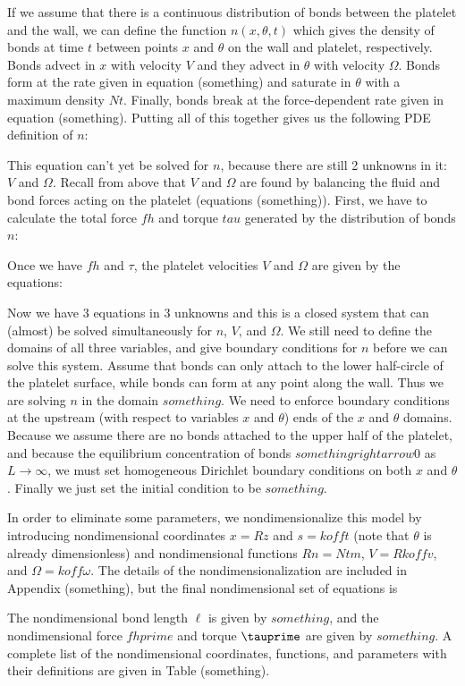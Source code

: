 If we assume that there is a continuous distribution of bonds between
the platelet and the wall, we can define the function $n(x, \theta,
t)$ which gives the density of bonds at time $t$ between points $x$
and $\theta$ on the wall and platelet, respectively. Bonds advect in
$x$ with velocity $V$ and they advect in $\theta$ with velocity
$\Omega$. Bonds form at the rate given in equation (something) and
saturate in $\theta$ with a maximum density $Nt$. Finally, bonds break
at the force-dependent rate given in equation (something). Putting all
of this together gives us the following PDE definition of $n$:

This equation can't yet be solved for $n$, because there are still 2
unknowns in it: $V$ and $\Omega$. Recall from above that $V$ and
$\Omega$ are found by balancing the fluid and bond forces acting on
the platelet (equations (something)). First, we have to calculate the
total force $fh$ and torque $tau$ generated by the distribution of
bonds $n$:

Once we have $fh$ and $\tau$, the platelet velocities $V$ and $\Omega$
are given by the equations: %

Now we have 3 equations in 3 unknowns and this is a closed system that
can (almost) be solved simultaneously for $n$, $V$, and $\Omega$. We
still need to define the domains of all three variables, and give
boundary conditions for $n$ before we can solve this system. Assume
that bonds can only attach to the lower half-circle of the platelet
surface, while bonds can form at any point along the wall. Thus we are
solving $n$ in the domain $something$. We need to enforce boundary
conditions at the upstream (with respect to variables $x$ and
$\theta$) ends of the $x$ and $\theta$ domains. Because we assume
there are no bonds attached to the upper half of the platelet, and
because the equilibrium concentration of bonds $something rightarrow
0$ as $L \rightarrow \infty$, we must set homogeneous Dirichlet
boundary conditions on both $x$ and $\theta$. Finally we just set the
initial condition to be $something$.

In order to eliminate some parameters, we nondimensionalize this model
by introducing nondimensional coordinates $x = Rz$ and $s = koff t$
(note that $\theta$ is already dimensionless) and nondimensional
functions $R n = Nt m$, $V = R koff v$, and $\Omega = koff
\omega$. The details of the nondimensionalization are included in
Appendix (something), but the final nondimensional set of equations is

The nondimensional bond length $\ell$ is given by $something$, and the
nondimensional force $fhprime$ and torque $\tauprime$ are given by
$something$. A complete list of the nondimensional coordinates,
functions, and parameters with their definitions are given in Table
(something).